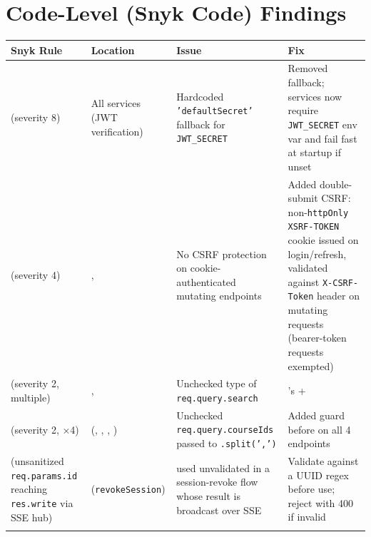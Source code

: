 \documentclass[11pt]{article}
\begin{document}
\pagebreak
\section{Code-Level (Snyk Code) Findings}

\small
\begin{longtable}{L{3.4cm}L{3.6cm}L{4.1cm}L{4.5cm}}
\toprule
\textbf{Snyk Rule} & \textbf{Location} & \textbf{Issue} & \textbf{Fix} \\
\midrule
\endhead

 (severity 8) &
All services (JWT verification) &
Hardcoded \texttt{'defaultSecret'} fallback for \texttt{JWT\_SECRET} &
Removed fallback; services now require \texttt{JWT\_SECRET} env var and fail fast at startup if unset \\
\addlinespace

 (severity 4) &
,  &
No CSRF protection on cookie-authenticated mutating endpoints &
Added double-submit CSRF: non-\texttt{httpOnly} \texttt{XSRF-TOKEN} cookie issued on login/refresh, validated against \texttt{X-CSRF-Token} header on mutating requests (bearer-token requests exempted) \\
\addlinespace

 (severity 2, multiple) &
,  &
Unchecked type of \texttt{req.query.search} &
's  +  \\
\addlinespace

 (severity 2, $\times$4) &
 (, , , ) &
Unchecked \texttt{req.query.courseIds} passed to \texttt{.split(',')} &
Added  guard before  on all 4 endpoints \\
\addlinespace

 (unsanitized \texttt{req.params.id} reaching \texttt{res.write} via SSE hub) &
 (\texttt{revokeSession}) &
 used unvalidated in a session-revoke flow whose result is broadcast over SSE &
Validate  against a UUID regex before use; reject with 400 if invalid \\
\addlinespace


\end{longtable}
\end{document}

